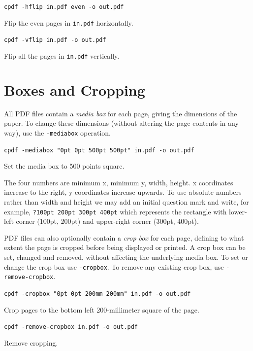 \documentclass{book}
\begin{document}
  \begin{framed}
    \noindent\small\verb!cpdf -hflip in.pdf even -o out.pdf!

    \vspace{2.5mm}
    \noindent Flip the even pages in \texttt{in.pdf} horizontally.

    \vspace{2.5mm}
    \noindent\verb!cpdf -vflip in.pdf -o out.pdf!

    \vspace{2.5mm}
    \noindent Flip all the pages in \texttt{in.pdf} vertically.
  \end{framed}

  \section{Boxes and Cropping}
  All PDF files contain a \textit{media box} for each page, giving the
dimensions of the paper. To change these dimensions (without altering the page
contents in any way), use the \texttt{-mediabox} operation.

  \begin{framed}
  \noindent\small\verb!cpdf -mediabox "0pt 0pt 500pt 500pt" in.pdf -o out.pdf!

  \vspace{2.5mm}
  \noindent Set the media box to 500 points square.
  \end{framed}

  \noindent The four numbers are minimum x, minimum y, width, height. x
coordinates increase to the right, y coordinates increase upwards. To use absolute numbers rather than width and height we may add an initial question mark and write, for example, \texttt{?100pt 200pt 300pt 400pt} which represents the rectangle with lower-left corner (100pt, 200pt) and upper-right corner (300pt, 400pt).

  PDF files can also optionally contain a \textit{crop box} for each page,
defining to what extent the page is cropped before being displayed or printed.
A crop box can be set, changed and removed, without affecting the underlying
media box. To set or change the crop box use \texttt{-cropbox}. To remove any
existing crop box, use \texttt{-remove-cropbox}.

  \begin{framed}
  \noindent\small\verb!cpdf -cropbox "0pt 0pt 200mm 200mm" in.pdf -o out.pdf!

  \vspace{2.5mm}
  \noindent Crop pages to the bottom left 200-millimeter square of the page.

  \vspace{2.5mm}
  \noindent\verb!cpdf -remove-cropbox in.pdf -o out.pdf!
  
  \vspace{2.5mm}
  \noindent Remove cropping.
  \end{framed}
\end{document}
